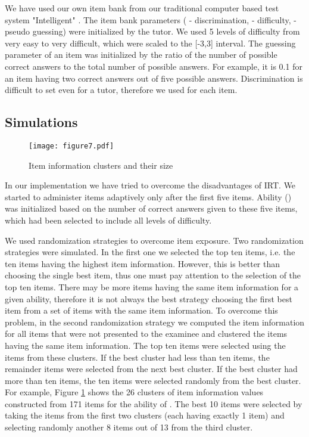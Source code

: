 \documentclass[11pt,twoside]{article}
\begin{document}
We have used our own item bank from our traditional computer based test system "Intelligent" \cite{ANTAL}. The item bank  parameters ( - discrimination,  - difficulty,  - pseudo guessing) were initialized by the tutor. We used 5 levels of difficulty from very easy to very difficult, which were scaled to the [-3,3] interval. The guessing parameter of an item was initialized by the ratio of the number of possible correct answers to the total number of possible answers. For example, it is 0.1 for an item having two correct answers out of five possible answers. Discrimination is difficult to set even for a tutor, therefore we used  for each item. 

\subsection{Simulations}

\begin{figure}
\begin{center}    \texttt{[image: figure7.pdf]} \end{center}
\caption{\label{fig:II_clusters} Item information clusters and their size} 
\end{figure}

In our implementation we have tried to overcome the disadvantages of IRT. We started to administer items adaptively only after the first five items. Ability () was initialized based on the number of correct answers given to these five items, which  had been selected to include all levels of difficulty.


We used randomization strategies to overcome item exposure. Two randomization strategies were simulated. In the first one we selected the top ten items, i.e. the ten items having the highest item information. However, this is better than choosing the single best item, thus one must pay attention to the selection of the top ten items. 
There may be more items having the same item information for a given ability, therefore it is not always the best strategy choosing the first best item from a set of items with the same item information. To overcome this problem, in the second randomization strategy we computed the item information for all items that were not presented to the examinee and clustered the items having the same item information. The top ten items were selected using the items from these clusters. If the best cluster had less than ten items, the remainder items were selected from the next best cluster. If the best cluster had more than ten items, the ten items were selected randomly from the best cluster. 
For example, Figure \ref{fig:II_clusters} shows the 26 clusters of item information values constructed from 171 items for the ability of . The best 10 items were selected by taking the items from the first two clusters (each having exactly 1 item) and selecting randomly another 8 items out of 13 from the third cluster. 
\end{document}
